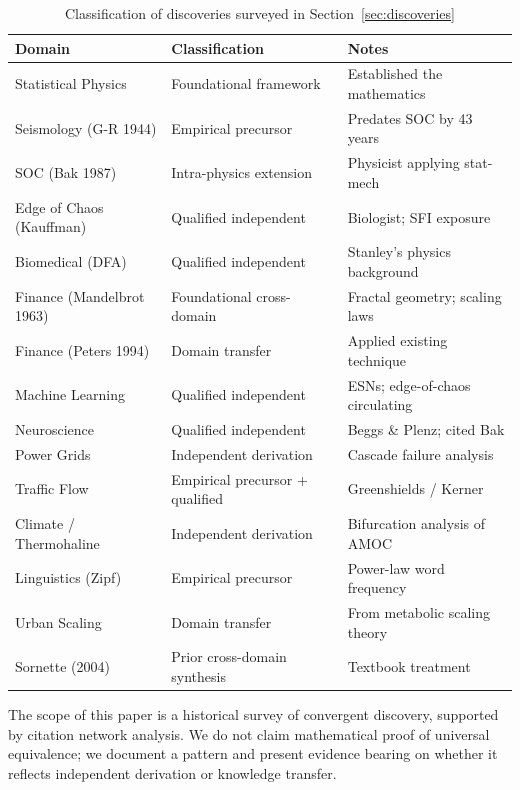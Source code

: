 \documentclass[11pt]{article}
\begin{document}
\begin{table}[ht]
\centering
\caption{Classification of discoveries surveyed in Section~\ref{sec:discoveries}}
\label{tab:classification}
\begin{tabular}{lll}
\toprule
\textbf{Domain} & \textbf{Classification} & \textbf{Notes} \\
\midrule
Statistical Physics & Foundational framework & Established the mathematics \\
Seismology (G-R 1944) & Empirical precursor & Predates SOC by 43 years \\
SOC (Bak 1987) & Intra-physics extension & Physicist applying stat-mech \\
Edge of Chaos (Kauffman) & Qualified independent & Biologist; SFI exposure \\
Biomedical (DFA) & Qualified independent & Stanley's physics background \\
Finance (Mandelbrot 1963) & Foundational cross-domain & Fractal geometry; scaling laws \\
Finance (Peters 1994) & Domain transfer & Applied existing technique \\
Machine Learning & Qualified independent & ESNs; edge-of-chaos circulating \\
Neuroscience & Qualified independent & Beggs \& Plenz; cited Bak \\
Power Grids & Independent derivation & Cascade failure analysis \\
Traffic Flow & Empirical precursor + qualified & Greenshields / Kerner \\
Climate / Thermohaline & Independent derivation & Bifurcation analysis of AMOC \\
Linguistics (Zipf) & Empirical precursor & Power-law word frequency \\
Urban Scaling & Domain transfer & From metabolic scaling theory \\
Sornette (2004) & Prior cross-domain synthesis & Textbook treatment \\
\bottomrule
\end{tabular}
\end{table}

The scope of this paper is a historical survey of convergent discovery, supported by citation network analysis. We do not claim mathematical proof of universal equivalence; we document a pattern and present evidence bearing on whether it reflects independent derivation or knowledge transfer.
\end{document}
